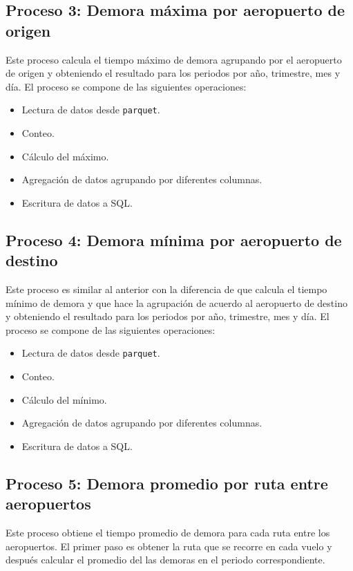 \subsection{Proceso 3: Demora máxima por aeropuerto de origen}

Este proceso calcula el tiempo máximo de demora agrupando por el aeropuerto de origen y obteniendo el resultado para los periodos por año, trimestre, mes y día. El proceso se compone de las siguientes operaciones:

\begin{itemize}
	\item Lectura de datos desde \texttt{parquet}.
	\item Conteo.
	\item Cálculo del máximo.
	\item Agregación de datos agrupando por diferentes columnas.
	\item Escritura de datos a SQL.
\end{itemize}

\subsection{Proceso 4: Demora mínima por aeropuerto de destino}

Este proceso es similar al anterior con la diferencia de que calcula el tiempo mínimo de demora y que hace la agrupación de acuerdo al aeropuerto de destino y obteniendo el resultado para los periodos por año, trimestre, mes y día. El proceso se compone de las siguientes operaciones:

\begin{itemize}
	\item Lectura de datos desde \texttt{parquet}.
	\item Conteo.
	\item Cálculo del mínimo.
	\item Agregación de datos agrupando por diferentes columnas.
	\item Escritura de datos a SQL.
\end{itemize}

\subsection{Proceso 5: Demora promedio por ruta entre aeropuertos}

Este proceso obtiene el tiempo promedio de demora para cada ruta entre los aeropuertos. El primer paso es obtener la ruta que se recorre en cada vuelo y después calcular el promedio del las demoras en el periodo correspondiente.

